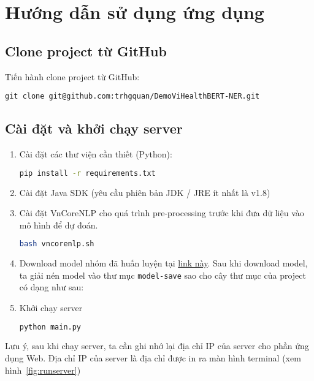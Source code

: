 \section{Hướng dẫn sử dụng ứng dụng}
\subsection{Clone project từ GitHub}
Tiến hành clone project từ GitHub:
\begin{lstlisting}
git clone git@github.com:trhgquan/DemoViHealthBERT-NER.git
\end{lstlisting}

\subsection{Cài đặt và khởi chạy server}
\begin{enumerate}
\item Cài đặt các thư viện cần thiết (Python):
\lstset{style=mystyle}
\begin{lstlisting}[language=bash]
pip install -r requirements.txt
\end{lstlisting}

\item Cài đặt Java SDK (yêu cầu phiên bản JDK / JRE ít nhất là v1.8)

\item Cài đặt VnCoreNLP cho quá trình pre-processing trước khi đưa dữ liệu vào mô hình để dự đoán.

\lstset{style=mystyle}
\begin{lstlisting}[language=bash]
bash vncorenlp.sh
\end{lstlisting}

\item Download model nhóm đã huấn luyện tại  \href{https://drive.google.com/drive/u/2/folders/19AGLo-27EeuXDkKG2JstuCgrcwB0854r}{link này}. Sau khi download model, ta giải nén model vào thư mục \texttt{model-save} sao cho cây thư mục của project có dạng như sau:


\item Khởi chạy server
\lstset{style=mystyle}
\begin{lstlisting}[language=bash]
python main.py 
\end{lstlisting}
\end{enumerate}
Lưu ý, sau khi chạy server, ta cần ghi nhớ lại địa chỉ IP của server cho phần ứng dụng Web. Địa chỉ IP của server là địa chỉ được in ra màn hình terminal (xem hình~\ref{fig:runserver})


